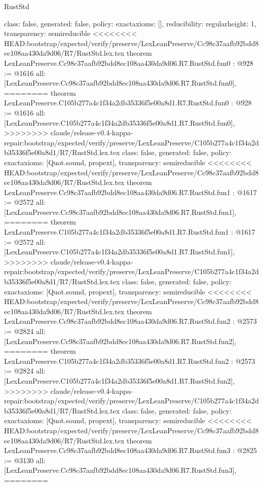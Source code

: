 \begin{lexlean}{RustStd}
\begin{coremodule}
{\begin{coremodule}
{{{  class: false,
  generated: false,
  policy: exact{axioms: []},
  reducibility: regular{height: 1},
  transparency: semireducible
}
<<<<<<<< HEAD:bootstrap/expected/verify/preserve/LexLeanPreserve/Cc98c37aafb92bdd8ec108aa430da9d06/R7/RustStd.lex.tex
theorem LexLeanPreserve.Cc98c37aafb92bdd8ec108aa430da9d06.R7.RustStd.fun0 : @928 := @1616 {
  all: [LexLeanPreserve.Cc98c37aafb92bdd8ec108aa430da9d06.R7.RustStd.fun0],
========
theorem LexLeanPreserve.C105b277a4c1f34a2db35336f5e00a8d1.R7.RustStd.fun0 : @928 := @1616 {
  all: [LexLeanPreserve.C105b277a4c1f34a2db35336f5e00a8d1.R7.RustStd.fun0],
>>>>>>>> claude/release-v0.4-kappa-repair:bootstrap/expected/verify/preserve/LexLeanPreserve/C105b277a4c1f34a2db35336f5e00a8d1/R7/RustStd.lex.tex
  class: false,
  generated: false,
  policy: exact{axioms: [Quot.sound, propext]},
  transparency: semireducible
}
<<<<<<<< HEAD:bootstrap/expected/verify/preserve/LexLeanPreserve/Cc98c37aafb92bdd8ec108aa430da9d06/R7/RustStd.lex.tex
theorem LexLeanPreserve.Cc98c37aafb92bdd8ec108aa430da9d06.R7.RustStd.fun1 : @1617 := @2572 {
  all: [LexLeanPreserve.Cc98c37aafb92bdd8ec108aa430da9d06.R7.RustStd.fun1],
========
theorem LexLeanPreserve.C105b277a4c1f34a2db35336f5e00a8d1.R7.RustStd.fun1 : @1617 := @2572 {
  all: [LexLeanPreserve.C105b277a4c1f34a2db35336f5e00a8d1.R7.RustStd.fun1],
>>>>>>>> claude/release-v0.4-kappa-repair:bootstrap/expected/verify/preserve/LexLeanPreserve/C105b277a4c1f34a2db35336f5e00a8d1/R7/RustStd.lex.tex
  class: false,
  generated: false,
  policy: exact{axioms: [Quot.sound, propext]},
  transparency: semireducible
}
<<<<<<<< HEAD:bootstrap/expected/verify/preserve/LexLeanPreserve/Cc98c37aafb92bdd8ec108aa430da9d06/R7/RustStd.lex.tex
theorem LexLeanPreserve.Cc98c37aafb92bdd8ec108aa430da9d06.R7.RustStd.fun2 : @2573 := @2824 {
  all: [LexLeanPreserve.Cc98c37aafb92bdd8ec108aa430da9d06.R7.RustStd.fun2],
========
theorem LexLeanPreserve.C105b277a4c1f34a2db35336f5e00a8d1.R7.RustStd.fun2 : @2573 := @2824 {
  all: [LexLeanPreserve.C105b277a4c1f34a2db35336f5e00a8d1.R7.RustStd.fun2],
>>>>>>>> claude/release-v0.4-kappa-repair:bootstrap/expected/verify/preserve/LexLeanPreserve/C105b277a4c1f34a2db35336f5e00a8d1/R7/RustStd.lex.tex
  class: false,
  generated: false,
  policy: exact{axioms: [Quot.sound, propext]},
  transparency: semireducible
}
<<<<<<<< HEAD:bootstrap/expected/verify/preserve/LexLeanPreserve/Cc98c37aafb92bdd8ec108aa430da9d06/R7/RustStd.lex.tex
theorem LexLeanPreserve.Cc98c37aafb92bdd8ec108aa430da9d06.R7.RustStd.fun3 : @2825 := @3130 {
  all: [LexLeanPreserve.Cc98c37aafb92bdd8ec108aa430da9d06.R7.RustStd.fun3],
========
}}}}}}
\end{coremodule}}
\end{coremodule}
\end{lexlean}
